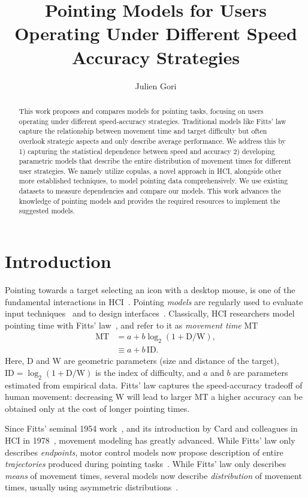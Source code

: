 \documentclass[manuscript,review,anonymous]{acmart}
\title{Pointing Models for Users Operating Under Different Speed Accuracy Strategies}
\author{Julien Gori}
\affiliation{%
  \institution{Sorbonne Université, CNRS, ISIR}
  \city{Paris}
  \country{France}
}
\begin{document}
\begin{abstract}
	This work proposes and compares models for pointing tasks, focusing on users operating under different speed-accuracy strategies. Traditional models like Fitts' law capture the relationship between movement time and target difficulty but often overlook strategic aspects and only describe average performance. We address this by 1) capturing the statistical dependence between speed and accuracy 2) developing parametric models that describe the entire distribution of movement times for different user strategies. We namely utilize copulas, a novel approach in HCI, alongside other more established techniques, to model pointing data comprehensively. We use existing datasets to measure dependencies and compare our models. This work advances the knowledge of pointing models and provides the required resources to implement the suggested models.
\end{abstract}
\maketitle


\section{Introduction\label{sec:introduction}}
Pointing towards a target \eg selecting an icon with a desktop mouse, is one of the fundamental interactions in HCI~\cite{soukoreff2004, card1978}. Pointing \textit{models} are regularly used to evaluate input techniques~\cite{soukoreff2004} and to design interfaces~\cite{cockburn2007}.
Classically, HCI researchers model pointing time with Fitts' law~\cite{fitts1954, soukoreff2004, gori2018tochi}, and refer to it as \textit{movement time} MT
\begin{align}
	\text{MT} & = a + b \log_2 (1 + \text{D}/\text{W}), \label{eq:fitts} \\
	          & \equiv a + b\,\text{ID}.
\end{align}
Here, D and W are geometric parameters (size and distance of the target), $\text{ID}=\log_2 (1 + \text{D}/\text{W})$ is the index of difficulty, and $a$ and $b$ are parameters estimated from empirical data.
Fitts' law captures the speed-accuracy tradeoff of human movement: decreasing W will lead to larger MT \ie a higher accuracy can be obtained only at the cost of longer pointing times.


Since Fitts' seminal 1954 work~\cite{fitts1954}, and its introduction by Card and colleagues in HCI in 1978~\cite{card1978}, movement modeling has greatly advanced.
While Fitts' law only describes \emph{endpoints}, motor control models now propose description of entire \emph{trajectories} produced during pointing tasks~\cite{todorov2002, saveriano2023, fischer2021, gori2020, gori2023}.
While Fitts' law only describes \emph{means} of movement times, several models now describe \emph{distribution} of movement times, usually using asymmetric distributions~\cite{chapuis2007, jude2016, gori2019,li2024,zhao2022, nieuwenhuizen2016}.
\end{document}
